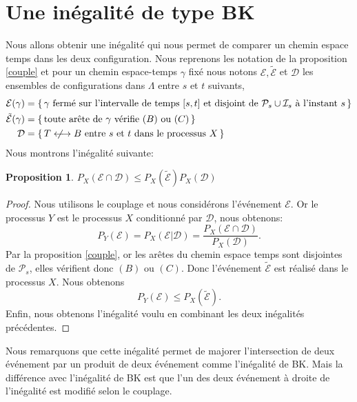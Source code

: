 \documentclass[titlepage,a4paper,12pt]{article}
\newcounter{th}
\newcounter{propo}
\newtheorem{prop}[propo]{Proposition}
\newcommand{\nlongleftrightarrow}{\longleftrightarrow \kern-15pt\not \kern15pt}
\begin{document}
\section{Une inégalité de type BK}
Nous allons obtenir une inégalité qui nous permet de comparer un chemin espace temps dans les deux configuration. Nous reprenons les notation de la proposition \ref{couple} et pour un chemin espace-temps $\gamma$ fixé nous notons $\mathcal{E},\tilde{\mathcal{E}}$ et $\mathcal{D}$ les ensembles de configurations dans $\Lambda$ entre $s$ et $t$ suivants,
\begin{align*}
\mathcal{E}(\gamma)&=\{\,\gamma \text{ fermé sur l'intervalle de temps }[s ,t]\text{ et disjoint de }\mathcal{P}_s\cup \mathcal{I}_s \text{ à l'instant }s\,\}\\
\tilde{\mathcal{E}}(\gamma)&=\{\,\text{toute arête de }\gamma\text{ vérifie } (B)\text{ ou }(C) \,\}\\
\mathcal{D}& = \{\,T\nlongleftrightarrow B \text{ entre }s \text{ et }t\text{ dans le processus }X\,\}
\end{align*}
Nous montrons l'inégalité suivante:
\begin{prop} \label{BK'}
$P_X(\mathcal{E}\cap\mathcal{D})\leqslant P_X(\tilde{\mathcal{E}})P_X(\mathcal{D})$
\end{prop}
\begin{proof}
Nous utilisons le couplage et nous considérons l'événement $\mathcal{E}$. Or le processus $Y$ est le processus $X$ conditionné par $\mathcal{D}$, nous obtenons:
$$P_Y(\mathcal{E}) = P_X(\mathcal{E}|\mathcal{D}) =  \frac{P_X(\mathcal{E}\cap\mathcal{D})}{P_X(\mathcal{D})}.
$$
Par la proposition \ref{couple}, or les arêtes du chemin espace temps sont disjointes de $\mathcal{P}_s$, elles vérifient donc $(B)$ ou $(C)$. Donc l'événement $\tilde{\mathcal{E}}$ est réalisé dans le processus $X$. Nous obtenons
$$ P_Y(\mathcal{E})\leqslant P_X(\tilde{\mathcal{E}}).
$$
Enfin, nous obtenons l'inégalité voulu en combinant les deux inégalités précédentes.
\end{proof}
Nous remarquons que cette inégalité permet de majorer l'intersection de deux événement par un produit de deux événement comme l'inégalité de BK. Mais la différence avec l'inégalité de BK est que l'un des deux événement à droite de l'inégalité est modifié selon le couplage. 
\end{document}
